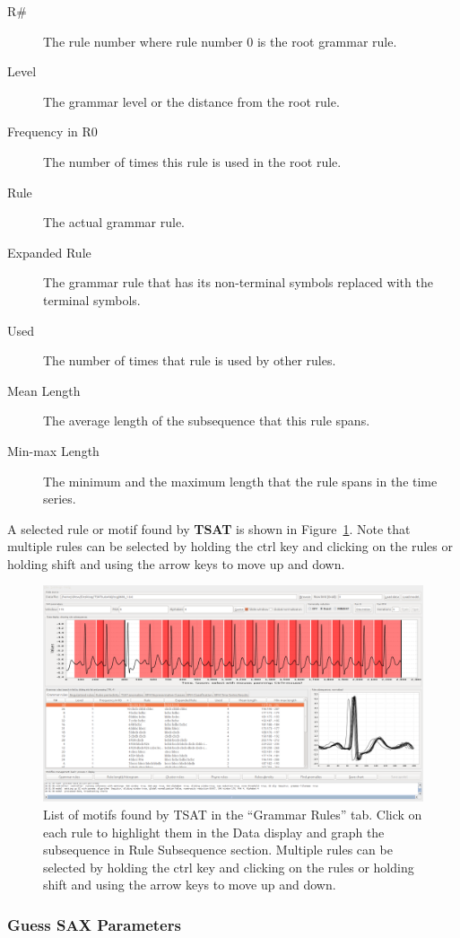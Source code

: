 \documentclass[letterpaper, 12pt]{article}
\newcommand\TSAT{\textbf{TSAT}}
\begin{document}
\begin{description}
	\item[R\#] The rule number where rule number 0 is the root grammar rule.
	\item[Level]  The grammar level or the distance from the root rule.
	\item[Frequency in R0]  The number of times this rule is used in the root rule.
	\item[Rule] The actual grammar rule.
	\item[Expanded Rule]  The grammar rule that has its non-terminal symbols replaced with the terminal symbols.
	\item[Used]  The number of times that rule is used by other rules.
	\item[Mean Length] The average length of the subsequence that this rule spans.
	\item[Min-max Length] The minimum and the maximum length that the rule spans in the time series.
\end{description}

A selected rule or motif found by {\TSAT} is shown in Figure~\ref{fig:step3-motifs}.  Note that multiple rules can be selected by holding the ctrl key and clicking on the rules or holding shift and using the arrow keys to move up and down.

\begin{figure}[H]
	\centering
	\includegraphics[width=0.7\linewidth]{pictures/motifguide/step3-motifs}
	\caption{List of motifs found by TSAT in the ``Grammar Rules'' tab.  Click on each rule to highlight them in the Data display and graph the subsequence in Rule Subsequence section.  Multiple rules can be selected by holding the ctrl key and clicking on the rules or holding shift and using the arrow keys to move up and down.}
	\label{fig:step3-motifs}
\end{figure}


\subsubsection{Guess SAX Parameters}
\end{document}
